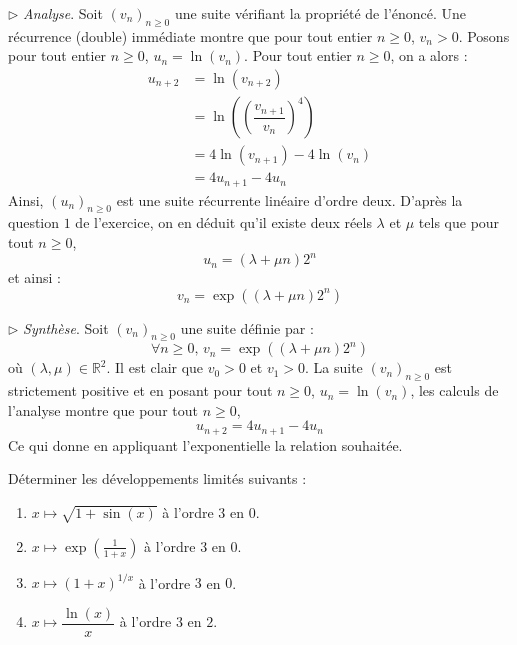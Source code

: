\documentclass[a4paper,10pt]{report}
\begin{document}
\noindent $\rhd$ \textit{Analyse}. Soit $(v_n)_{n \geq 0}$ une suite vérifiant la propriété de l'énoncé. Une récurrence (double) immédiate montre que pour tout entier $n \geq 0$, $v_n>0$. Posons pour tout entier $n \geq 0$, $u_n = \ln(v_n)$. Pour tout entier $n \geq 0$, on a alors :
\begin{align*}
u_{n+2} & = \ln(v_{n+2}) \\
& = \ln \left(\left(\dfrac{v_{n+1}}{v_n}\right)^4\right) \\
& = 4 \ln(v_{n+1}) - 4 \ln(v_n) \\
& = 4 u_{n+1} - 4 u_n 
\end{align*}
Ainsi, $(u_n)_{n \geq 0}$ est une suite récurrente linéaire d'ordre deux. D'après la question $1$ de l'exercice, on en déduit qu'il existe deux réels $\lambda$ et $\mu$ tels que pour tout $n \geq 0$,
$$ u_n = (\lambda+\mu n)2^n$$
et ainsi :
$$ v_n = \exp((\lambda+ \mu n)2^n)$$

\medskip

\noindent $\rhd$ \textit{Synthèse}. Soit $(v_n)_{n \geq 0}$ une suite définie par :
$$ \forall n \geq 0, \, v_n = \exp((\lambda+ \mu n)2^n)$$
où $(\lambda, \mu) \in \mathbb{R}^2$. Il est clair que $v_0>0$ et $v_1>0$. La suite $(v_n)_{n \geq 0}$ est strictement positive et en posant pour tout $n \geq 0$, $u_n = \ln(v_n)$, les calculs de l'analyse montre que pour tout $n \geq 0$,
$$ u_{n+2} = 4u_{n+1}- 4u_n$$
Ce qui donne en appliquant l'exponentielle la relation souhaitée.

\medskip

%
%
%
%
%

\begin{Exa}
Déterminer les développements limités suivants :

\begin{multicols}{2}
\begin{enumerate}
\item $x \mapsto \sqrt{1+\sin(x)}$ à l'ordre $3$ en $0$.
\item $x \mapsto \exp \left( \frac{1}{1+x}\right)$ à l'ordre $3$ en $0$.
\item $x \mapsto (1+x)^{1/x}$ à l'ordre $3$ en $0$.
\item $x \mapsto \dfrac{\ln(x)}{x}$ à l'ordre $3$ en $2$.
\end{enumerate}
\end{multicols}

\vspace{0.1cm}
\end{Exa} 
\end{document}
